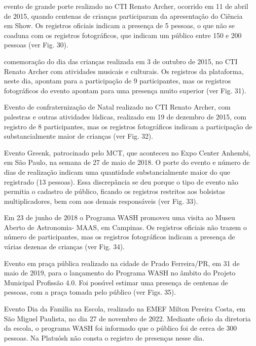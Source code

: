 \documentclass[
12pt,		%
openright,	%
twoside,  %
a4paper,			%
chapter=TITLE,		%
english,			%
french,				%
spanish,			%
brazil				%
]{USPSC-classe/USPSC}
\begin{document}
\begin{alineas}
\item evento de grande porte realizado no CTI Renato Archer, ocorrido em 11 de abril de 2015, quando centenas de crian\c{c}as participaram da apresenta\c{c}\~ao do \textquotedbl Ci\^encia em Show\textquotedbl . Os registros oficiais indicam a presen\c{c}a de 5 pessoas, o que n\~ao se coaduna com os registros fotogr\'aficos, que indicam um p\'ublico entre 150 e 200 pessoas (ver Fig. 30).
\item comemora\c{c}\~ao do dia das crian\c{c}as realizada em 3 de outubro de 2015, no CTI Renato Archer com atividades musicais e culturais. Os registros da plataforma, neste dia, apontam para a participa\c{c}\~ao de 9 participantes, mas os registros fotogr\'aficos do evento apontam para uma presen\c{c}a muito superior (ver Fig. 31).
\item Evento de confraterniza\c{c}\~ao de Natal realizado no CTI Renato Archer, com palestras e outras atividades l\'udicas, realizado em 19 de dezembro de 2015, com registro de 8 participantes, mas os registros fotogr\'aficos indicam a participa\c{c}\~ao de substancialmente maior de crian\c{c}as (ver Fig. 32).
\item Evento Greenk, patrocinado pelo MCT, que aconteceu no Expo Center Anhembi, em S\~ao Paulo, na semana de 27 de maio de 2018. O porte do evento e n\'umero de dias de realiza\c{c}\~ao indicam uma quantidade substancialmente maior do que registrado (13 pessoas). Essa discrep\^ancia se deu porque o tipo de evento n\~ao permitia o cadastro de p\'ublico, ficando os registros restritos aos bolsistas multiplicadores, bem com aos demais respons\'aveis (ver Fig. 33).
\item Em 23 de junho de 2018 o Programa WASH promoveu uma visita ao Museu Aberto de Astronomia- MAAS, em Campinas. Os registros oficiais n\~ao trazem o n\'umero de participantes, mas os registros fotogr\'aficos indicam a presen\c{c}a de v\'arias dezenas de crian\c{c}as (ver Fig. 34).
\item Evento em pra\c{c}a p\'ublica realizado na cidade de Prado Ferreira/PR, em 31 de maio de 2019, para o lan\c{c}amento do Programa WASH no \^ambito do Projeto Municipal Profiss\~ao 4.0. Foi poss\'{\i}vel estimar uma presen\c{c}a de centenas de pessoas, com a pra\c{c}a tomada pelo p\'ublico (ver Figs. 35).
\item Evento Dia da Fam\'{\i}lia na Escola, realizado na EMEF Milton Pereira Costa, em S\~ao Miguel Paulista, no dia 27 de novembro de 2022. Mediante of\'{\i}cio da diretoria da escola, o programa WASH foi informado que o p\'ublico foi de cerca de 300 pessoas. Na Platu\'osh n\~ao consta o registro de presen\c{c}as nesse dia.
\end{alineas}
\end{document}
